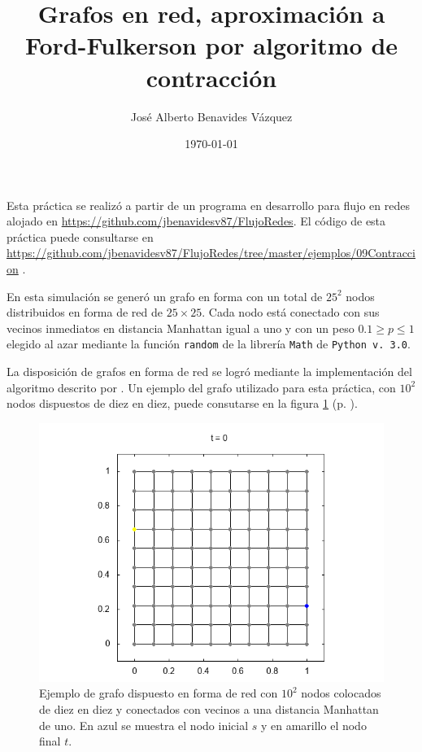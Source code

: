 \documentclass{article}
\title{Grafos en red, aproximación a Ford-Fulkerson por algoritmo de contracción}
\author{José Alberto Benavides Vázquez}
\date{\today}
\begin{document}
  \maketitle

  Esta práctica se realizó a partir de un programa en desarrollo para flujo en redes alojado en \url{https://github.com/jbenavidesv87/FlujoRedes}. El código de esta práctica puede consultarse en \url{https://github.com/jbenavidesv87/FlujoRedes/tree/master/ejemplos/09Contraccion} \citep{Grafos}.

  En esta simulación se generó un grafo en forma con un total de $25^2$ nodos distribuidos en forma de red de $25 \times 25$. Cada nodo está conectado con sus vecinos inmediatos en distancia Manhattan igual a uno y con un peso $0.1 \geq p \leq 1$ elegido al azar mediante la función \texttt{random} de la librería \texttt{Math} de \texttt{Python v. 3.0}.

  La disposición de grafos en forma de red se logró mediante la implementación del algoritmo descrito por \citep{manhattan}. Un ejemplo del grafo utilizado para esta práctica, con $10^2$ nodos dispuestos de diez en diez, puede consutarse en la figura \ref{t000} (p. \pageref{t000}).

  \begin{figure}[h]
    \includegraphics[width=1\textwidth]{t000}
    \centering
    \caption{Ejemplo de grafo dispuesto en forma de red con $10^2$ nodos colocados de diez en diez y conectados con vecinos a una distancia Manhattan de uno. En azul se muestra el nodo inicial $s$ y en amarillo el nodo final $t$.}
    \label{t000}
  \end{figure}
\end{document}
